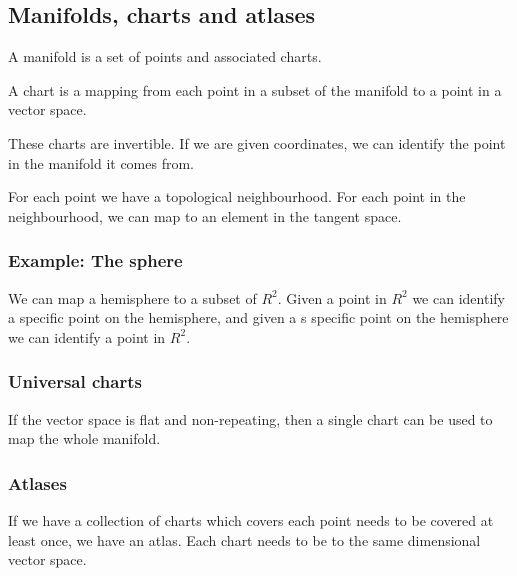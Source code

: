 
\subsection{Manifolds, charts and atlases}

A manifold is a set of points and associated charts.

A chart is a mapping from each point in a subset of the manifold to a point in a vector space.

These charts are invertible. If we are given coordinates, we can identify the point in the manifold it comes from.

For each point we have a topological neighbourhood. For each point in the neighbourhood, we can map to an element in the tangent space.

\subsubsection{Example: The sphere}

We can map a hemisphere to a subset of \(R^2\). Given a point in \(R^2\) we can identify a specific point on the hemisphere, and given a s specific point on the hemisphere we can identify a point in \(R^2\).

\subsubsection{Universal charts}

If the vector space is flat and non-repeating, then a single chart can be used to map the whole manifold.

\subsubsection{Atlases}

If we have a collection of charts which covers each point needs to be covered at least once, we have an atlas. Each chart needs to be to the same dimensional vector space.


